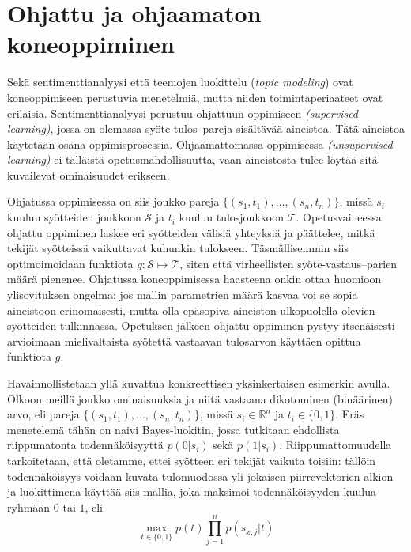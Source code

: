 \documentclass[finnish,gradu,twoside,12pt]{tktltiki}
\begin{document}
{%

\section{Ohjattu ja ohjaamaton koneoppiminen}

Sekä sentimenttianalyysi että teemojen luokittelu (\textit{topic modeling}) ovat koneoppimiseen perustuvia menetelmiä, mutta niiden toimintaperiaateet ovat erilaisia. Sentimenttianalyysi perustuu ohjattuun oppimiseen \textit{(supervised learning)}, jossa on olemassa syöte-tulos--pareja sisältävää aineistoa. Tätä aineistoa käytetään osana oppimisprosessia. Ohjaamattomassa oppimisessa \textit{(unsupervised learning)} ei tälläistä opetusmahdollisuutta, vaan aineistosta tulee löytää sitä kuvailevat ominaisuudet erikseen.

Ohjatussa oppimisessa on siis joukko pareja $\{ (s_1, t_1), \ldots , (s_n, t_n) \}$, missä $s_i$ kuuluu syötteiden joukkoon $\mathcal{S}$ ja $t_i$ kuuluu tulosjoukkoon  $\mathcal{T}$. Opetusvaiheessa ohjattu oppiminen laskee eri syötteiden välisiä yhteyksiä ja päättelee, mitkä tekijät syötteissä vaikuttavat kuhunkin tulokseen. Täsmällisemmin siis optimoimoidaan funktiota $g: \mathcal{S} \mapsto \mathcal{T}$, siten että virheellisten syöte-vastaus--parien määrä pienenee. Ohjatussa koneoppimisessa haasteena onkin ottaa huomioon ylisovituksen ongelma: jos mallin parametrien määrä kasvaa voi se sopia aineistoon erinomaisesti, mutta olla epäsopiva aineiston ulkopuolella olevien syötteiden tulkinnassa. Opetuksen jälkeen ohjattu oppiminen pystyy itsenäisesti arvioimaan mielivaltaista syötettä vastaavan tulosarvon käyttäen opittua funktiota $g$.

Havainnollistetaan yllä kuvattua konkreettisen yksinkertaisen esimerkin avulla. Olkoon meillä joukko ominaisuuksia ja niitä vastaana dikotominen (binäärinen) arvo, eli pareja $\{ (s_1, t_1), \ldots , (s_n, t_n) \}$, missä $s_i \in \mathbb{R}^n$ ja $t_i \in \{0,1\}$. Eräs menetelemä tähän on naivi Bayes-luokitin, jossa tutkitaan ehdollista riippumatonta todennäköisyyttä $p( 0 | s_i )$ sekä $p( 1 | s_i )$. Riippumattomuudella tarkoitetaan, että oletamme, ettei syötteen eri tekijät vaikuta toisiin: tällöin todennäköisyys voidaan kuvata tulomuodossa yli jokaisen piirrevektorien alkion ja luokittimena käyttää siis mallia, joka maksimoi todennäköisyyden kuulua ryhmään $0$ tai $1$, eli  $$\max_{t \in \{0,1\}} p(t) \prod_{j=1}^n p( s_{x,j} | t) $$

}
\end{document}
